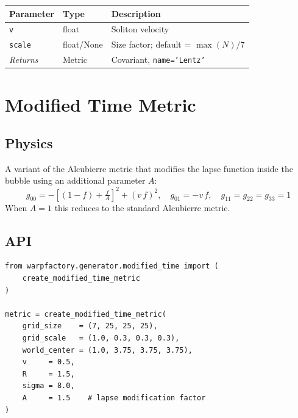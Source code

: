 \documentclass[11pt, a4paper, twoside]{report}
\begin{document}
\begin{center}
\begin{tabularx}{\linewidth}{llX}
  \toprule
  Parameter & Type & Description \\
  \midrule
  \texttt{v}     & float       & Soliton velocity \\
  \texttt{scale} & float/None  & Size factor; default = $\max(N)/7$ \\
  \midrule
  \emph{Returns} & Metric      & Covariant, \texttt{name='Lentz'} \\
  \bottomrule
\end{tabularx}
\end{center}

\section{Modified Time Metric}
\label{sec:modtime}

\subsection{Physics}

A variant of the Alcubierre metric that modifies the lapse function
inside the bubble using an additional parameter $A$:
\begin{equation}
  g_{00} = -\left[(1 - f) + \tfrac{f}{A}\right]^2 + (v\,f)^2, \quad
  g_{01} = -v\,f, \quad g_{11} = g_{22} = g_{33} = 1
\end{equation}
When $A=1$ this reduces to the standard Alcubierre metric.

\subsection{API}

\begin{lstlisting}[caption={Modified time metric}]
from warpfactory.generator.modified_time import (
    create_modified_time_metric
)

metric = create_modified_time_metric(
    grid_size    = (7, 25, 25, 25),
    grid_scale   = (1.0, 0.3, 0.3, 0.3),
    world_center = (1.0, 3.75, 3.75, 3.75),
    v     = 0.5,
    R     = 1.5,
    sigma = 8.0,
    A     = 1.5    # lapse modification factor
)
\end{lstlisting}

\end{document}
